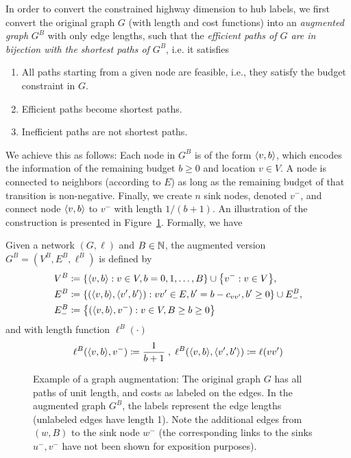 In order to convert the constrained highway dimension to hub labels, we first convert the original graph $G$ (with length and cost functions) into an \emph{augmented graph} $G^B$ with only edge lengths, such that the \emph{efficient paths of $G$ are in bijection with the shortest paths of $G^B$}, i.e. it satisfies
\begin{enumerate}[nosep]
\item All paths starting from a given node are feasible, i.e., they satisfy the budget constraint in $G$.
\item Efficient paths become shortest paths.
\item Inefficient paths are not shortest paths.
\end{enumerate}
We achieve this as follows: Each node in $G^B$ is of the form $\langle v,b\rangle$, which encodes the information of the remaining budget $b\geq 0$ and location $v\in V$.
A node is connected to neighbors (according to $E$) as long as the remaining budget of that transition is non-negative.
Finally, we create $n$ sink nodes, denoted $v^-$, and connect node $\langle v,b\rangle$ to $v^-$ with length $1/(b+1)$.
An illustration of the construction is presented in Figure~\ref{fig:augmented}.
Formally, we have
\begin{definition}
Given a network $(G,\ell)$ and $B\in\mathbb{N}$, the augmented version $G^B=(V^B,E^B,\ell^B)$ is defined by
\begin{align*}
V^B &\defeq\crl*{\pp{v,b}: v\in V, b=0,1,\ldots,B}\cup\crl*{v^-:v\in V},\\
E^B &\defeq\crl*{(\pp{v,b},\pp{v',b'}) : vv'\in E, b'=b-c_{vv'}, b'\geq 0}\cup E^{B}_{-},\\
E^{B}_{-} &\defeq \crl*{(\pp{v,b},v^-): v\in V, B\geq b\geq 0}
\end{align*}
and with length function $\ell^B(\cdot)$
\begin{align*}
\ell^B(\langle v,b\rangle,v^-) \coloneqq \frac{1}{b+1}\;,\;
\ell^B(\langle v,b\rangle,\langle v',b'\rangle) \coloneqq \ell(vv')
\end{align*}
\end{definition}



\begin{figure}
\label{fig:augmented}

\caption{Example of a graph augmentation: The original graph $G$ has all paths of unit length, and costs as labeled on the edges. In the augmented graph $G^B$, the labels represent the edge lengths (unlabeled edges have length 1). Note the additional edges from $(w,B)$ to the sink node $w^-$ (the corresponding links to the sinks $u^-,v^-$ have not been shown for exposition purposes). 
}
\end{figure}


